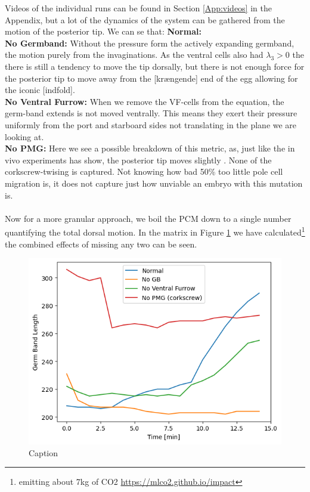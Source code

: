 Videos of the individual runs can be found in Section \ref{App:videos} in the Appendix, but a lot of the dynamics of the system can be gathered from the motion of the posterior tip. We can se that:
\textbf{Normal:} \\
\textbf{No Germband:} Without the pressure form the actively expanding germband, the motion purely from the invaginations. As the ventral cells also had $\lambda_3>0$ the there is still a tendency to move the tip dorsally, but there is not enough force for the posterior tip to move away from the [krængende] end of the egg allowing for the iconic [indfold]. \\
\textbf{No Ventral Furrow:} When we remove the VF-cells from the equation, the germ-band extends is not moved ventrally. This means they exert their pressure uniformly from the port and starboard sides not translating in the plane we are looking at.\\
\textbf{No PMG:} Here we see a possible breakdown of this metric, as, just like the in vivo experiments has show, the posterior tip moves slightly . None of the corkscrew-twising is captured. Not knowing how bad  50\% too little pole cell migration is, it does not capture just how unviable an embryo with this mutation is.   \\
\\


Now for a more granular approach, we boil the PCM down to a single number quantifying the total dorsal motion. In the matrix in Figure \ref{fig:PCM-matrix} we have calculated\footnote{emitting about 7kg of CO2 \url{https://mlco2.github.io/impact} } the combined effects of missing any two can be seen. 

\begin{figure}[H]
    \centering
    \includegraphics[width=1.\linewidth]{chapters/Results/figures/GB_len_mutants.png}
    \caption{Caption}
    \label{fig:PCM-matrix}
\end{figure}

